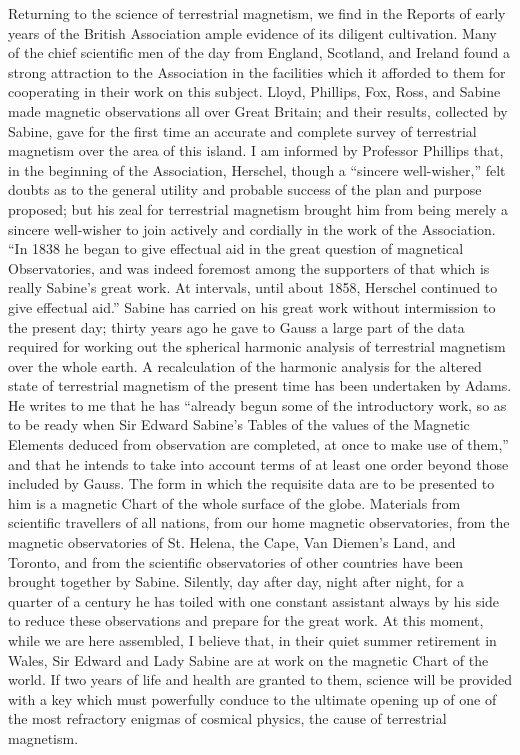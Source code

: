 \documentclass[a4paper, 11pt, oneside, english]{article}
\begin{document}
Returning to the science of terrestrial magnetism, we find in the Reports of early years of the British Association ample evidence of its diligent cultivation. Many of the chief scientific men of the day from England, Scotland, and Ireland found a strong attraction to the Association in the facilities which it afforded to them for cooperating in their work on this subject. Lloyd, Phillips, Fox, Ross, and Sabine made magnetic observations all over Great Britain; and their results, collected by Sabine, gave for the first time an accurate and complete survey of terrestrial magnetism over the area of this island. I am informed by Professor Phillips that, in the beginning of the Association, Herschel, though a ``sincere well-wisher,'' felt doubts as to the general utility and probable success of the plan and purpose proposed; but his zeal for terrestrial magnetism brought him from being merely a sincere well-wisher to join actively and cordially in the work of the Association. ``In 1838 he began to give effectual aid in the great question of magnetical Observatories, and was indeed foremost among the supporters of that which is really Sabine's great work. At intervals, until about 1858, Herschel continued to give effectual aid.'' Sabine has carried on his great work without intermission to the present day; thirty years ago he gave to Gauss a large part of the data required for working out the spherical harmonic analysis of terrestrial magnetism over the whole earth. A recalculation of the harmonic analysis for the altered state of terrestrial magnetism of the present time has been undertaken by Adams. He writes to me that he has ``already begun some of the introductory work, so as to be ready when Sir Edward Sabine's Tables of the values of the Magnetic Elements deduced from observation are completed, at once to make use of them,'' and that he intends to take into account terms of at least one order beyond those included by Gauss. The form in which the requisite data are to be presented to him is a magnetic Chart of the whole surface of the globe. Materials from scientific travellers of all nations, from our home magnetic observatories, from the magnetic observatories of St. Helena, the Cape, Van Diemen's Land, and Toronto, and from the scientific observatories of other countries have been brought together by Sabine. Silently, day after day, night after night, for a quarter of a century he has toiled with one constant assistant always by his side to reduce these observations and prepare for the great work. At this moment, while we are here assembled, I believe that, in their quiet summer retirement in Wales, Sir Edward and Lady Sabine are at work on the magnetic Chart of the world. If two years of life and health are granted to them, science will be provided with a key which must powerfully conduce to the ultimate opening up of one of the most refractory enigmas of cosmical physics, the cause of terrestrial magnetism.
\end{document}
